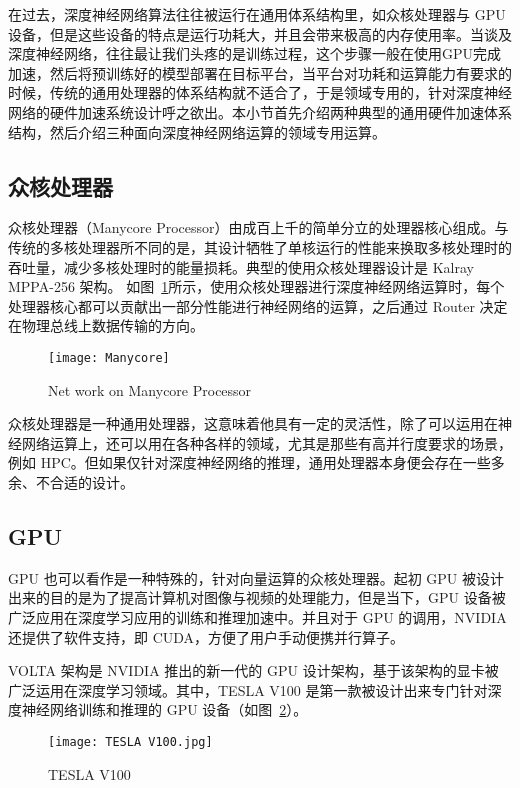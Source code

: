在过去，深度神经网络算法往往被运行在通用体系结构里，如众核处理器与 GPU 设备，但是这些设备的特点是运行功耗大，并且会带来极高的内存使用率。当谈及深度神经网络，往往最让我们头疼的是训练过程，这个步骤一般在使用GPU完成加速，然后将预训练好的模型部署在目标平台，当平台对功耗和运算能力有要求的时候，传统的通用处理器的体系结构就不适合了，于是领域专用的，针对深度神经网络的硬件加速系统设计呼之欲出。本小节首先介绍两种典型的通用硬件加速体系结构，然后介绍三种面向深度神经网络运算的领域专用运算。

\subsection{众核处理器}

众核处理器（Manycore Processor）由成百上千的简单分立的处理器核心组成。与传统的多核处理器所不同的是，其设计牺牲了单核运行的性能来换取多核处理时的吞吐量，减少多核处理时的能量损耗。典型的使用众核处理器设计是 Kalray MPPA-256 架构。
如图~\ref{fig:Manycore}所示，使用众核处理器进行深度神经网络运算时，每个处理器核心都可以贡献出一部分性能进行神经网络的运算，之后通过 Router 决定在物理总线上数据传输的方向。


\begin{figure}[!htbp]
    \centering
    \texttt{[image: Manycore]}
    \caption{Net work on Manycore Processor}
    \label{fig:Manycore}
\end{figure}

众核处理器是一种通用处理器，这意味着他具有一定的灵活性，除了可以运用在神经网络运算上，还可以用在各种各样的领域，尤其是那些有高并行度要求的场景，例如 HPC。但如果仅针对深度神经网络的推理，通用处理器本身便会存在一些多余、不合适的设计。 

\subsection{GPU}

GPU 也可以看作是一种特殊的，针对向量运算的众核处理器。起初 GPU 被设计出来的目的是为了提高计算机对图像与视频的处理能力，但是当下，GPU 设备被广泛应用在深度学习应用的训练和推理加速中。并且对于 GPU 的调用，NVIDIA 还提供了软件支持，即 CUDA，方便了用户手动便携并行算子。

VOLTA 架构是 NVIDIA 推出的新一代的 GPU 设计架构，基于该架构的显卡被广泛运用在深度学习领域。其中，TESLA V100 是第一款被设计出来专门针对深度神经网络训练和推理的 GPU 设备（如图~\ref{fig:TESLA V100}）。

\begin{figure}[!htbp]
    \centering
    \texttt{[image: TESLA V100.jpg]}
    \caption{TESLA V100}
    \label{fig:TESLA V100}
\end{figure}

